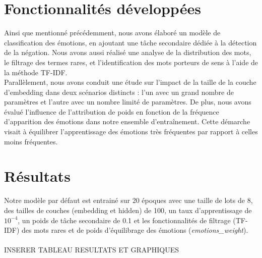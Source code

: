 \documentclass{article}
\begin{document}
\section{Fonctionnalités développées}
Ainsi que mentionné précédemment, nous avons élaboré un modèle de classification des émotions, en ajoutant une tâche secondaire dédiée à la détection de la négation. Nous avons aussi réalisé une analyse de la distribution des mots, le filtrage des termes rares, et l'identification des mots porteurs de sens à l'aide de la méthode TF-IDF. \\
Parallèlement, nous avons conduit une étude sur l'impact de la taille de la couche d'embedding dans deux scénarios distincts : l'un avec un grand nombre de paramètres et l'autre avec un nombre limité de paramètres. De plus, nous avons évalué l'influence de l'attribution de poids en fonction de la fréquence d'apparition des émotions dans notre ensemble d'entraînement. Cette démarche visait à équilibrer l'apprentissage des émotions très fréquentes par rapport à celles moins fréquentes.

\section{Résultats}

Notre modèle par défaut est entrainé sur 20 époques avec une taille de lots de 8, des tailles de couches (embedding et hidden) de 100, un taux d'apprentissage de $10^{-4}$, un poids de tâche secondaire de 0.1 et les fonctionnalités de filtrage (TF-IDF) des mots rares et de poids d'équilibrage des émotions (\textit{emotions\_weight}).
\\\\
INSERER TABLEAU RESULTATS ET GRAPHIQUES
\end{document}
